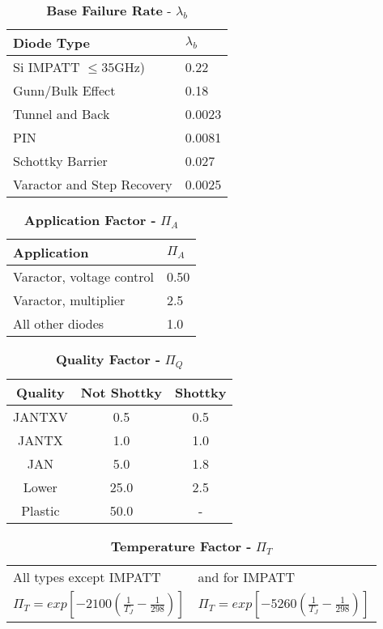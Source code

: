 \begin{table}
\caption{\textbf{Base Failure Rate} - $\lambda_{b}$}
\label{table:baseFailureRateDiodeHigh}
\begin{tabular}{|l|m{10cm}|} \hline
\textbf{Diode Type} & $\lambda_{b}$ \\ \hline
Si IMPATT $\leq 35$GHz) & 0.22 \\ \hline
Gunn/Bulk Effect & 0.18 \\ \hline
Tunnel and Back & 0.0023 \\ \hline
PIN & 0.0081 \\ \hline
Schottky Barrier & 0.027 \\ \hline
Varactor and Step Recovery & 0.0025 \\ \hline
\end{tabular}
\end{table}

\begin{table}
\caption{\textbf{Application Factor -} $\Pi_{A}$}
\label{table:applicationFactorHigh}
\begin{tabular}{|l|m{10cm}|} \hline
\textbf{Application} & $\Pi_{A}$ \\ \hline
Varactor, voltage control & 0.50 \\ \hline
Varactor, multiplier & 2.5 \\ \hline
All other diodes & 1.0 \\ \hline
\end{tabular}
\end{table}

\begin{table}
\caption{\textbf{Quality Factor -} $\Pi_{Q}$}
\label{table:applicationFactorHigh}
\begin{tabular}{|c|c|c|} \hline
\textbf{Quality} & \textbf{Not Shottky} & \textbf{Shottky} \\ \hline
JANTXV & 0.5 & 0.5 \\ \hline
JANTX & 1.0 & 1.0 \\ \hline
JAN & 5.0 & 1.8 \\ \hline
Lower & 25.0 & 2.5 \\ \hline
Plastic & 50.0 & - \\ \hline
\end{tabular}
\end{table}


\begin{table}
\caption{\textbf{Temperature Factor -} $\Pi_{T}$  }
\label{table:temperatureFactorHigh}
\begin{tabular}{l l}  
All types except IMPATT & and for IMPATT \\
$\Pi_{T} = exp[-2100(\frac{1}{T_{J}} - \frac{1}{298})]$ & 
$\Pi_{T} = exp[-5260(\frac{1}{T_{J}} - \frac{1}{298})]$ \\ 
\end{tabular}
\end{table}





